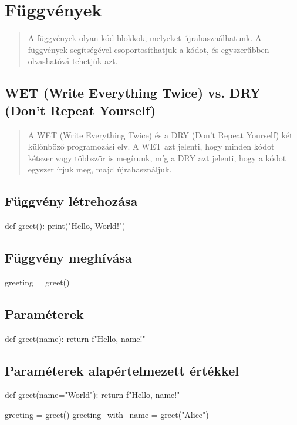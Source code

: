 \section{Függvények}

\begin{quote}
    A függvények olyan kód blokkok, melyeket újrahasználhatunk.
    A függvények segítségével csoportosíthatjuk a kódot, és egyszerűbben olvashatóvá tehetjük azt.
\end{quote}

\subsection{WET (Write Everything Twice) vs. DRY (Don't Repeat Yourself)}

\begin{quote}
    A WET (Write Everything Twice) és a DRY (Don't Repeat Yourself) két különböző programozási elv.
    A WET azt jelenti, hogy minden kódot kétszer vagy többször is megírunk, míg a DRY azt jelenti, hogy a kódot egyszer írjuk meg, majd újrahasználjuk.
\end{quote}

\subsection{Függvény létrehozása}
\begin{pycode}
    def greet():
       print("Hello, World!")
\end{pycode}


\subsection{Függvény meghívása}
\begin{pycode}
    greeting = greet()
\end{pycode}

\subsection{Paraméterek}
\begin{pycode}
    def greet(name):
        return f"Hello, {name}!"
\end{pycode}

\newpage
\subsection{Paraméterek alapértelmezett értékkel}
\begin{pycode}
    def greet(name="World"):
        return f"Hello, {name}!"

    greeting = greet()
    greeting_with_name = greet("Alice")
\end{pycode}

